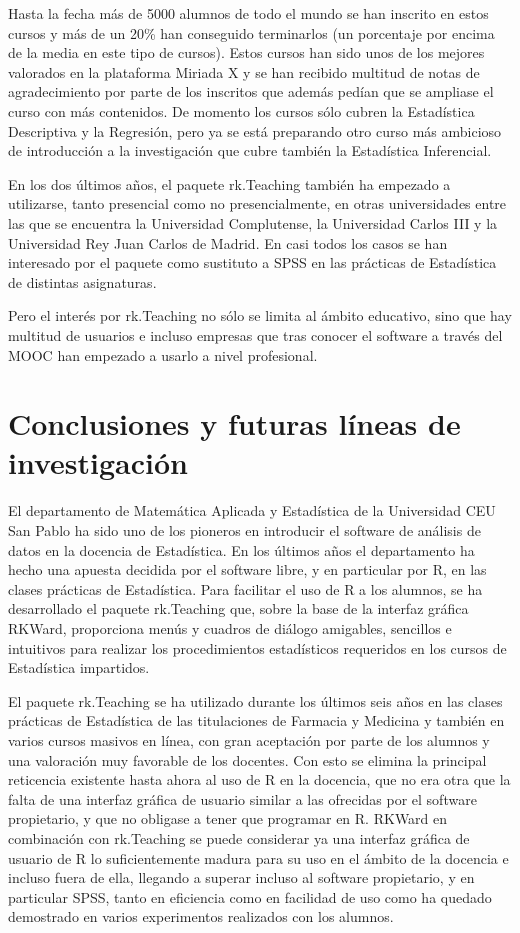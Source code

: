 \documentclass[a4paper,10pt,twoside]{article}
\newcommand{\rkteaching}{\textsf{rk.Teaching}}
\newcommand{\rkward}{\textsf{RKWard}}
\newcommand{\spss}{\textsf{SPSS}}
\begin{document}
Hasta la fecha más de 5000 alumnos de todo el mundo se han inscrito en estos cursos y más de un 20\% han conseguido
terminarlos (un porcentaje por encima de la media en este tipo de cursos).
Estos cursos han sido unos de los mejores valorados en la plataforma Miriada X y se han recibido multitud de notas de
agradecimiento por parte de los inscritos que además pedían que se ampliase el curso con más contenidos. 
De momento los cursos sólo cubren la Estadística Descriptiva y la Regresión, pero ya se está preparando otro curso más
ambicioso de introducción a la investigación que cubre también la Estadística Inferencial. 

En los dos últimos años, el paquete \rkteaching{} también ha empezado a utilizarse, tanto presencial como no
presencialmente, en otras universidades entre las que se encuentra la Universidad Complutense, la Universidad Carlos III y la Universidad Rey Juan Carlos de Madrid.
En casi todos los casos se han interesado por el paquete como sustituto a \spss{} en las prácticas de Estadística de
distintas asignaturas.

Pero el interés por \rkteaching{} no sólo se limita al ámbito educativo, sino que hay multitud de usuarios e incluso
empresas que tras conocer el software a través del MOOC han empezado a usarlo a nivel profesional. 


\section{Conclusiones y futuras líneas de investigación}
\label{s:conclusiones}
El departamento de Matemática Aplicada y Estadística de la Universidad CEU San Pablo ha sido uno de los pioneros en
introducir el software de análisis de datos en la docencia de Estadística. 
En los últimos años el departamento ha hecho una apuesta decidida por el software libre, y en particular por R, en las
clases prácticas de Estadística. 
Para facilitar el uso de R a los alumnos, se ha desarrollado el paquete \rkteaching{} que, sobre la base de la interfaz
gráfica \rkward{}, proporciona menús y cuadros de diálogo amigables, sencillos e intuitivos para realizar los
procedimientos estadísticos requeridos en los cursos de Estadística impartidos. 

El paquete \rkteaching{} se ha utilizado durante los últimos seis años en las clases prácticas de Estadística de las
titulaciones de Farmacia y Medicina y también en varios cursos masivos en línea, con gran aceptación por parte de los
alumnos y una valoración muy favorable de los docentes.
Con esto se elimina la principal reticencia existente hasta ahora al uso de R en la docencia, que no era otra que la
falta de una interfaz gráfica de usuario similar a las ofrecidas por el software propietario, y que no obligase a tener
que programar en R.
\rkward{} en combinación con \rkteaching{} se puede considerar ya una interfaz gráfica de usuario de R lo
suficientemente madura para su uso en el ámbito de la docencia e incluso fuera de ella, llegando a superar incluso al
software propietario, y en particular \spss{}, tanto en eficiencia como en facilidad de uso como ha quedado
demostrado en varios experimentos realizados con los alumnos. 
\end{document}
